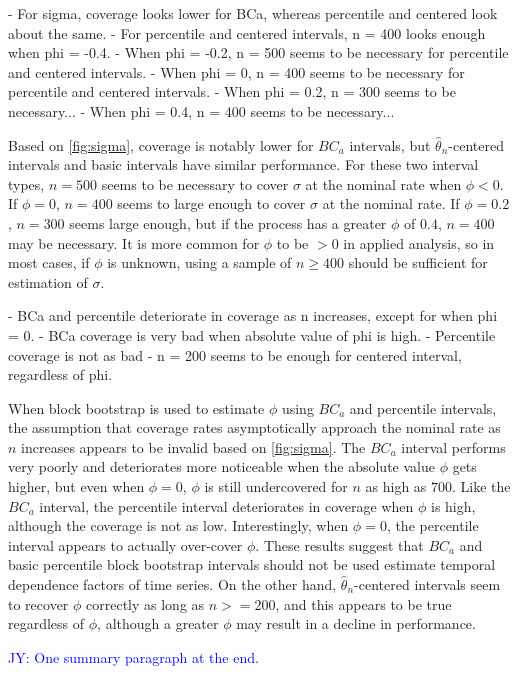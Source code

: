 \documentclass[12pt, letterpaper, titlepage]{article}
\newcommand{\jy}[1]{\textcolor{blue}{JY: #1}}
\begin{document}
- For sigma, coverage looks lower for BCa, whereas percentile and centered
look about the same.
- For percentile and centered intervals, n = 400 looks enough when phi = -0.4.
- When phi = -0.2, n = 500 seems to be necessary for percentile and centered
intervals.
- When phi = 0, n = 400 seems to be necessary for percentile and centered
intervals.
- When phi = 0.2, n = 300 seems to be necessary...
- When phi = 0.4, n = 400 seems to be necessary...


Based on \ref{fig:sigma}, coverage is
notably lower for $BC_a$ intervals, but $\hat{\theta}_{n}$-centered intervals
and basic intervals have similar performance. For these two interval types,
$n = 500$ seems to be necessary to cover $\sigma$ at the nominal rate when
$\phi < 0$. If $\phi = 0$, $n = 400$ seems to large enough to cover $\sigma$ at
the nominal rate. If $\phi = 0.2$, $n = 300$ seems large enough, but if the
process has a greater $\phi$ of $0.4$, $n = 400$ may be necessary. It is more
common for $\phi$ to be $> 0$ in applied analysis, so in most cases, if $\phi$
is unknown, using a sample of $n \geq 400$ should be sufficient for estimation
of $\sigma$.

- BCa and percentile deteriorate in coverage as n increases, except for when
phi = 0.
- BCa coverage is very bad when absolute value of phi is high.
- Percentile coverage is not as bad
- n = 200 seems to be enough for centered interval, regardless of phi.


When block bootstrap is used to estimate $\phi$ using $BC_a$ and percentile
intervals, the assumption that coverage rates asymptotically approach the
nominal rate as $n$ increases appears to be invalid based on \ref{fig:sigma}.
The $BC_a$ interval performs very poorly and deteriorates more noticeable
when the absolute value $\phi$ gets
higher, but even when $\phi = 0$, $\phi$ is still undercovered for $n$ as high
as $700$. Like the $BC_a$ interval, the percentile interval deteriorates in
coverage when $\phi$ is high, although the coverage is not as low.
Interestingly, when $\phi = 0$, the percentile interval appears to actually
over-cover $\phi$. These results suggest that $BC_a$ and basic percentile
block bootstrap intervals should not be used estimate temporal dependence
factors of time series. On the other hand, $\hat{\theta}_{n}$-centered
intervals seem to recover $\phi$ correctly as long as $n >= 200$, and this
appears to be true regardless of $\phi$, although a greater $\phi$ may result
in a decline in performance.

\jy{One summary paragraph at the end.}
\end{document}
